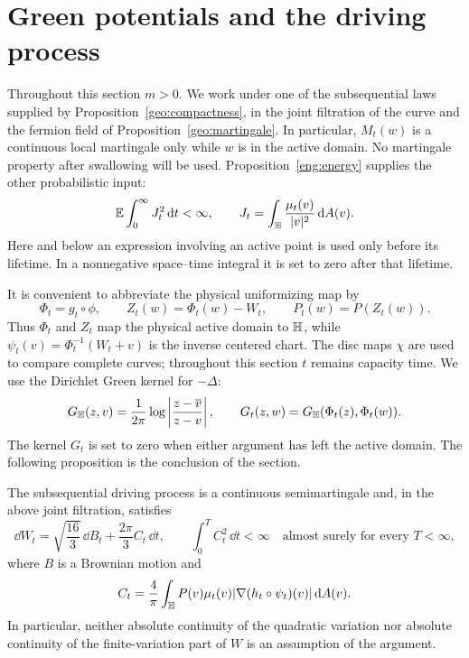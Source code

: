 \section{Green potentials and the driving process}
\label{cal:section}

Throughout this section $m>0$.  We work under one of the subsequential
laws supplied by Proposition~\ref{geo:compactness}, in the joint filtration
of the curve and the fermion field of Proposition~\ref{geo:martingale}.
In particular, $M_t(w)$ is a continuous local martingale only while $w$
is in the active domain.  No martingale property after swallowing will
be used.  Proposition~\ref{eng:energy} supplies the other probabilistic input:
\begin{equation}
 \mathbb E\int_0^\infty J_t^2\,\mathrm d t<\infty,
 \qquad
 J_t=\int_{\mathbb H}\frac{\mu_t(v)}{|v|^2}\,\mathrm d A(v).
 \label{cal:energy-input}
\end{equation}
Here and below an expression involving an active point is used only
before its lifetime.  In a nonnegative space--time integral it is set
to zero after that lifetime.

It is convenient to abbreviate the physical uniformizing map by
\[
 \Phi_t=g_t\circ\phi,
 \qquad Z_t(w)=\Phi_t(w)-W_t,
 \qquad P_t(w)=P(Z_t(w)).
\]
Thus $\Phi_t$ and $Z_t$ map the physical active domain to $\mathbb H$,
while $\psi_t(v)=\Phi_t^{-1}(W_t+v)$ is the inverse centered chart.
The disc maps $\chi$ are used to compare complete curves; throughout
this section $t$ remains capacity time. We use the Dirichlet Green kernel
for $-\Delta$:
\begin{equation}
 G_{\mathbb H}(z,v)=\frac1{2\pi}
       \log\left|\frac{z-\overline v}{z-v}\right|,
 \qquad
 G_t(z,w)=G_{\mathbb H}(\Phi_t(z),\Phi_t(w)).
 \label{cal:green-normalization}
\end{equation}
The kernel $G_t$ is set to zero when either argument has left the active
domain.  The following proposition is the conclusion of the section.

\begin{proposition}
\label{cal:driver}
The subsequential driving process is a continuous semimartingale and,
in the above joint filtration, satisfies
\begin{equation}
 \dd W_t=\sqrt{\frac{16}{3}}\,\dd B_t+
                \frac{2\pi}{3}C_t\,\dd t,
 \qquad
 \int_0^T C_t^2\,\dd t<\infty\quad\text{almost surely for every }T<\infty,
 \label{cal:driver-equation}
\end{equation}
where $B$ is a Brownian motion and
\begin{equation}
 C_t=\frac4\pi\int_{\mathbb H}P(v)\mu_t(v)
              |\nabla(h_t\circ\psi_t)(v)|\,\mathrm d A(v).
 \label{cal:C-definition}
\end{equation}
In particular, neither absolute continuity of the quadratic variation
nor absolute continuity of the finite-variation part of $W$ is an
assumption of the argument.
\end{proposition}

